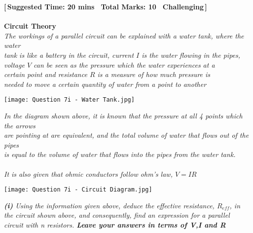 \textbf{\hypertarget{P7}{[\,Suggested Time: 20 mins \textbar \, Total Marks: 10 \textbar \, Challenging\,]}}\\
\\
\textbf{Circuit Theory} \\
\textit{The workings of a parallel circuit can be explained with a water tank, where the water \\
        tank is like a battery in the circuit, current \(I\) is the water flowing in the pipes, \\
        voltage \(V\) can be seen as the pressure which the water experiences at a \\
        certain point and resistance \(R\) is a measure of how much pressure is \\
        needed to move a certain quantity of water from a point to another}
\begin{center}
    \texttt{[image: Question 7i - Water Tank.jpg]}
\end{center}
\textit{In the diagram shown above, it is known that the pressure at all 4 points which the arrows \\
        are pointing at are equivalent, and the total volume of water that flows out of the pipes \\
        is equal to the volume of water that flows into the  pipes from the water tank. \\
        \\
        It is also given that ohmic conductors follow ohm's law, \(V = IR\) \\
}

\begin{center}
    \texttt{[image: Question 7i - Circuit Diagram.jpg]}
\end{center}

\newpage

\textit{
    \textbf{(i)} Using the information given above, deduce the effective resistance, \(R_{eff}\), in \\
    \hspace*{20pt} the circuit shown above, and consequently, find an expression for a parallel \\
    \hspace*{20pt} circuit with n resistors. \textbf{Leave your answers in terms of V,I and R}
}  \\


